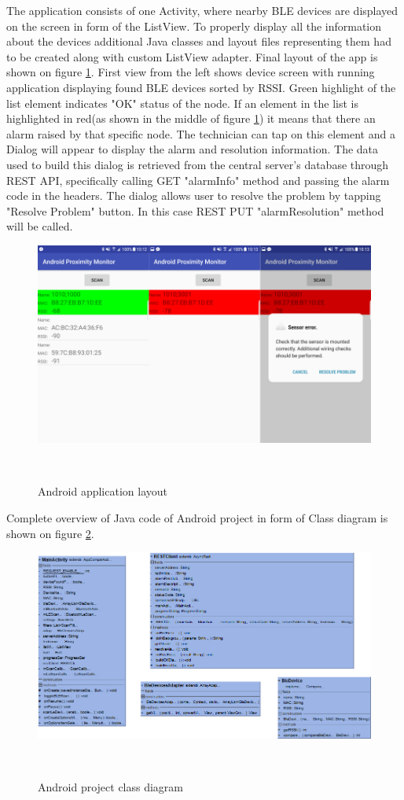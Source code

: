 The application consists of one Activity\cite{Activity}, where nearby BLE devices are displayed on the screen in form of the ListView\cite{ListView}. To properly display all the information about the devices additional Java classes and layout files representing them had to be created along with custom ListView adapter. Final layout of the app is shown on figure \ref{fig:AndroidScreenshots}. First view from the left shows device screen with running application displaying found BLE devices sorted by RSSI. Green highlight of the list element indicates "OK" status of the node. If an element in the list is highlighted in red(as shown in the middle of figure \ref{fig:AndroidScreenshots}) it means that there an alarm raised by that specific node. The technician can tap on this element and a Dialog\cite{Dialog} will appear to display the alarm and resolution information. The data used to build this dialog is retrieved from the central server's database through REST API, specifically calling GET "alarmInfo" method and passing the alarm code in the headers. The dialog allows user to resolve the problem by tapping "Resolve Problem" button. In this case REST PUT "alarmResolution" method will be called.

\begin{figure}[H]
\centering
\includegraphics[scale=0.65]{gfx/AndroidScreenshots}
\caption{Android application layout}~\label{fig:AndroidScreenshots}
\end{figure}

Complete overview of Java code of Android project in form of Class diagram is shown on figure \ref{fig:AndroidClass}. 

\begin{figure}[H]
\centering
\includegraphics[scale=0.45]{gfx/AndroidClassDiagram}
\caption{Android project class diagram}~\label{fig:AndroidClass}
\end{figure}

\nopagebreak[0]
